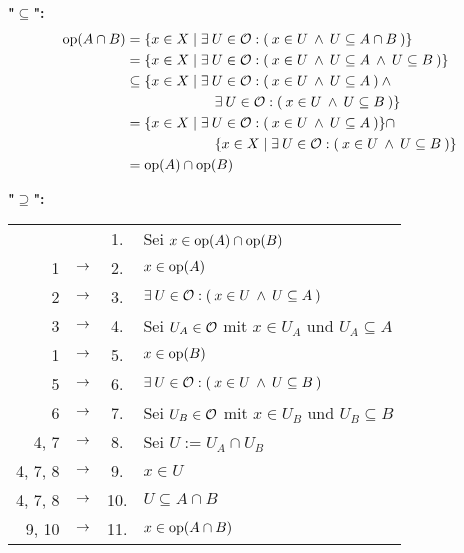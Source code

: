     \noindent
    \textbf{"$\boldsymbol{\subseteq}$":}
        \begin{align*}
            \text{op}(A \cap B) 
            &= \{x \in X \mid \exists\: U \in \mathcal{O}: (\: x \in U \:\land\: U \subseteq A \cap B \:)\}\\
            &= \{x \in X \mid \exists\: U \in \mathcal{O}: (\: x \in U \:\land\: U \subseteq A \:\land\: U \subseteq B \:)\}\\
            &\subseteq \{x \in X \mid \exists\: U \in \mathcal{O}: (\: x \in U \:\land\: U \subseteq A\:) \:\land\: \\
            &\hphantom{XXXXXXX} \exists\: U \in \mathcal{O}: (\: x \in U \:\land\: U \subseteq B \:)\}\\
            &= \{x \in X \mid \exists\: U \in \mathcal{O}: (\: x \in U \:\land\: U \subseteq A\:)\} \cap\\
            &\hphantom{XXXXXXX} \{ x \in X \mid \exists\: U \in \mathcal{O}: (\: x \in U \:\land\: U \subseteq B \:)\}\\
            &= \text{op}(A) \cap \text{op}(B)
        \end{align*}

    \noindent
    \textbf{"$\boldsymbol{\supseteq}$":}
        \begin{longtable}{r c c l}
            & & 1. & Sei $x \in \text{op}(A) \cap \text{op}(B)$ \\
            1 & $\rightarrow$ & 2. & $x \in \text{op}(A)$ \\
            2 & $\rightarrow$ & 3. & $\exists\: U \in \mathcal{O}: (\: x \in U \:\land\: U \subseteq A\:)$ \\
            3 & $\rightarrow$ & 4. & Sei $U_A \in \mathcal{O}$ mit $x \in U_A$ und $U_A \subseteq A$ \\
            1 & $\rightarrow$ & 5. & $x \in \text{op}(B)$ \\
            5 & $\rightarrow$ & 6. & $\exists\: U \in \mathcal{O}: (\: x \in U \:\land\: U \subseteq B\:)$ \\
            6 & $\rightarrow$ & 7. & Sei $U_B \in \mathcal{O}$ mit $x \in U_B$ und $U_B \subseteq B$ \\
            4, 7 & $\rightarrow$ & 8. & Sei $U := U_A \cap U_B$ \\
            4, 7, 8 & $\rightarrow$ & 9. & $x \in U$ \\
            4, 7, 8 & $\rightarrow$ & 10. & $U \subseteq A \cap B$ \\
            9, 10 & $\rightarrow$ & 11. & $x \in \text{op}(A \cap B)$ \\
        \end{longtable}



